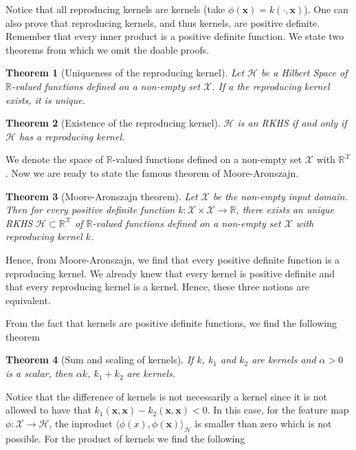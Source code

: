 \documentclass[12pt,a4paper,oneside]{book}
\newtheorem{Theorem}{Theorem}
\begin{document}
Notice that all reproducing kernels are kernels (take $\phi(\bm{x}) = k(\cdot,\bm{x})$). One can also prove that reproducing kernels, and thus kernels, are positive definite. Remember that every inner product is a positive definite function. 
We state two theorems from which we omit the doable proofs.

\begin{Theorem}[Uniqueness of the reproducing kernel] 
Let $\mathcal{H}$ be a Hilbert Space of $\mathbb{R}$-valued functions defined on a non-empty set $\mathcal{X}$. If a the reproducing kernel exists, it is unique.
\end{Theorem}

\begin{Theorem}[Existence of the reproducing kernel] 
$\mathcal{H}$ is an RKHS if and only if $\mathcal{H}$ has a reproducing kernel. 
\end{Theorem}

We denote the space of $\mathbb{R}$-valued functions defined on a non-empty set $\mathcal{X}$ with $\mathbb{R}^{\mathcal{X}}$. Now we are ready to state the famous theorem of Moore-Aronszajn.

\begin{Theorem}[Moore-Aronszajn theorem]
Let $\mathcal{X}$ be the non-empty input domain. Then for every positive definite function $k: \mathcal{X} \times \mathcal{X} \rightarrow \mathbb{R}$, there exists an unique RKHS $\mathcal{H} \subset \mathbb{R}^{\mathcal{X}}$ of $\mathbb{R}$-valued functions defined on a non-empty set $\mathcal{X}$  with reproducing kernel $k$.
\end{Theorem}

Hence, from Moore-Aronszajn, we find that every positive definite function is a reproducing kernel. We already knew that every kernel is positive definite and that every reproducing kernel is a kernel. Hence, these three notions are equivalent. 

From the fact that kernels are positive definite functions, we find the following theorem 

\begin{Theorem}[Sum and scaling of kernels]
If $k$, $k_1$ and $k_2$ are kernels  and $\alpha >0$ is a scalar, then $\alpha k$, $k_1 + k_2$ are kernels.
\end{Theorem}

Notice that the difference of kernels is not necessarily a kernel since it is not allowed to have that $k_1(\bm{x},\bm{x}) - k_2(\bm{x},\bm{x}) <0$. In this case, for the feature map $ \phi : \mathcal{X} \rightarrow \mathcal{H}$, the inproduct $\langle \phi(x),\phi(\bm{x}) \rangle_{\mathcal{H}}$ is smaller than zero which is not possible. For the product of kernels we find the following
\end{document}
